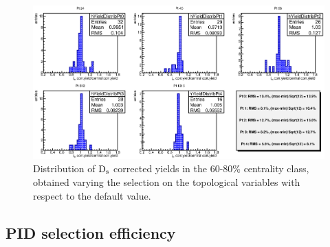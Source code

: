 \begin{figure}[!ht]
\begin{center}
\includegraphics[angle=0, width=15cm]{./FigCap5/FinalSyst_6080.eps}
\end{center}
\caption{Distribution of ${\rm D_s}$ corrected yields in the 60-80\% centrality class, obtained varying the selection on the topological variables with respect to the default value.}
\label{DsCutVar_6080} 
\end{figure}

\subsection{PID selection efficiency}

